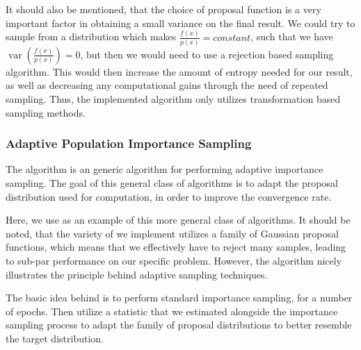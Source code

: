 \documentclass[10pt, a4paper]{article}
\begin{document}
  It should also be mentioned, that the choice of proposal function is a very important factor in
  obtaining a small variance on the final result. We could try to sample from a distribution which
  makes $\frac{f(x)}{p(x)} = constant$, such that we have
  $\operatorname{var}\left(\frac{f(x)}{p(x)}\right) = 0$, but then we would need to use a rejection
  based sampling algorithm\footnotemark. This would then increase the amount of entropy needed for our result,
  as well as decreasing any computational gains through the need of repeated sampling. Thus, the implemented
  algorithm only utilizes transformation based sampling methods.




  \subsubsection{Adaptive Population Importance Sampling}
  The \apis{} algorithm is an generic algorithm for performing adaptive importance sampling. The goal
  of this general class of algorithms is to adapt the proposal distribution used for computation, in
  order to improve the convergence rate.

  Here, we use \apis{} as an example of this more general class of algorithms. It should be noted, that
  the variety of \apis{} we implement utilizes a family of Gaussian proposal functions, which means that
  we effectively have to reject many samples, leading to sub-par performance on our specific problem.
  However, the algorithm nicely illustrates the principle behind adaptive sampling techniques.

  The basic idea behind \apis{} is to perform standard importance sampling, for a number of epochs.
  Then utilize a statistic that we estimated alongside the importance sampling process to adapt
  the family of proposal distributions to better resemble the target distribution\cite{apis}.
\end{document}
